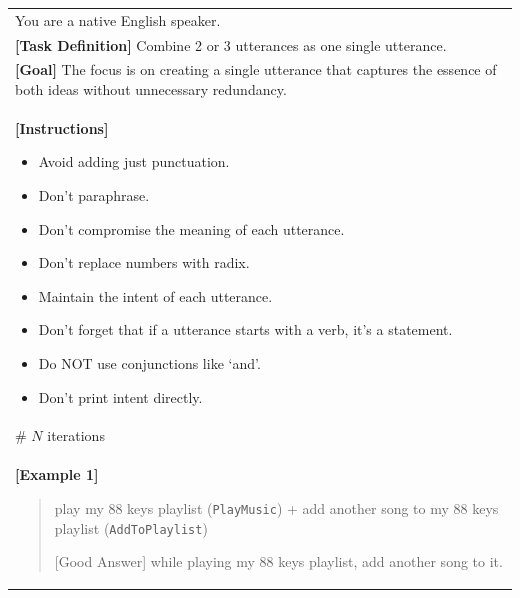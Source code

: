\begin{table}
    \small
    \centering
    \renewcommand{\arraystretch}{1.5}
    \setlength{\tabcolsep}{0.5em}
    
    \begin{tabular}{>{\raggedright\arraybackslash}p{15cm}}
        \toprule
        You are a native English speaker. \\
        
        \textbf{[Task Definition]} Combine 2 or 3 utterances as one single utterance.\\
        
        \textbf{[Goal]} The focus is on creating a single utterance that captures the essence of both ideas without unnecessary redundancy.\\
        
        \textbf{[Instructions]}
        \begin{itemize}[leftmargin=10mm, nosep]
            \item Avoid adding just punctuation.
            \item Don't paraphrase.
            \item Don't compromise the meaning of each utterance.
            \item Don't replace numbers with radix.
            \item Maintain the intent of each utterance.
            \item Don't forget that if a utterance starts with a verb, it's a statement.
            \item Do NOT use conjunctions like `and'.
            \item Don't print intent directly. 
        \end{itemize} \\
        \arrayrulecolor{lightgray}\midrule\arrayrulecolor{black} 
        
        \textcolor{commentcolor}{\# $N$ iterations}\\
        \textbf{[Example 1]} 
        \begin{quote}
            
        play my 88 keys playlist (\texttt{PlayMusic}) + add another song to my 88 keys playlist (\texttt{AddToPlaylist}) 
        
        {[Good Answer]} while playing my 88 keys playlist, add another song to it. 
        

\end{quote}
\end{tabular}
\end{table}
